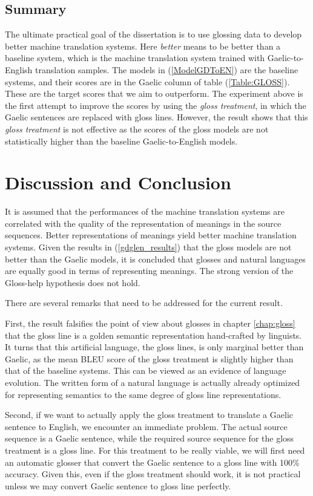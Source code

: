 \documentclass[final]{ua-thesis}
\numberwithin{equation}{section}
\begin{document}
\subsection{Summary}
The ultimate practical goal of the dissertation is to use glossing data to develop better machine translation systems. Here \textit{better} means to be better than a baseline system, which is the machine translation system trained with Gaelic-to-English translation samples. The models in (\ref{ModelGDToEN}) are the baseline systems, and their scores are in the Gaelic column of table (\ref{Table:GLOSS}). These are the target scores that we aim to outperform. The experiment above is the first attempt to improve the scores by using the \textit{gloss treatment}, in which the Gaelic sentences are replaced with gloss lines.  However, the result shows that this \textit{gloss treatment} is not effective as the scores of the gloss models are not statistically higher than the baseline Gaelic-to-English models. 

\section{Discussion and Conclusion}\label{section:cake1_Discussion}
It is assumed that the performances of the machine translation systems are correlated with the quality of the representation of meanings in the source sequences. Better representations of meanings yield better machine translation systems. Given the results in (\ref{gdglen_results}) that the gloss models are not better than the Gaelic models, it is concluded that glosses and natural languages are equally good in terms of representing meanings. The strong version of the Gloss-help hypothesis does not hold.

There are several remarks that need to be addressed for the current result. 

First, the result falsifies the point of view about glosses in chapter \ref{chap:gloss} that the gloss line is a golden semantic representation hand-crafted by linguists.
It turns that this artificial language, the gloss lines, is only marginal better than Gaelic, as the mean BLEU score of the gloss treatment is slightly higher than that of the baseline systems. This can be viewed as an evidence of language evolution.
The written form of a natural language is actually already optimized for representing semantics to the same degree of gloss line representations.

Second, if we want to actually apply the gloss treatment to translate a Gaelic sentence to English, we encounter an immediate problem. The actual source sequence is a Gaelic sentence, while the required source sequence for the gloss treatment is a gloss line. 
For this treatment to be really viable, we will first need an automatic glosser that convert the Gaelic sentence to a gloss line with 100\% accuracy. Given this, even if the gloss treatment should work, it is not practical unless we may convert Gaelic sentence to gloss line perfectly.      
\end{document}
